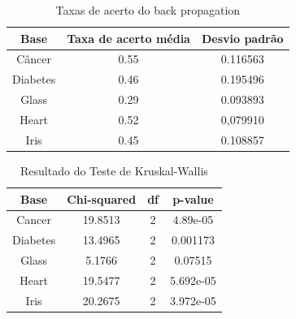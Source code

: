 \documentclass[12pt]{article}
\begin{document}
\begin{table}[!hp]
\center
\begin{tabular}{|c|c|c|}
\hline
Base & Taxa de acerto média & Desvio padrão\\ \hline
Câncer & 0.55 & 0.116563 \\ \hline
Diabetes & 0.46 & 0.195496 \\ \hline
Glass & 0.29 & 0.093893 \\ \hline
Heart & 0.52 & 0,079910 \\ \hline
Iris & 0.45 & 0.108857 \\ \hline
\end{tabular}
\caption{Taxas de acerto do back propagation}
\label{tab:hitaim}
\end{table}

\begin{table}[!h]
\center
\begin{tabular}{|c|c|c|c|}
\hline Base        & Chi-squared    & df    &  p-value \\
\hline Cancer      &  19.8513       &  2    &  4.89e-05   \\
\hline Diabetes    &  13.4965       &  2    &  0.001173   \\
\hline Glass       &   5.1766       &  2    &  0.07515    \\
\hline Heart       &  19.5477       &  2    &  5.692e-05  \\
\hline Iris        &  20.2675       &  2    &  3.972e-05  \\
\hline 
\end{tabular} 
\caption{Resultado do Teste de Kruskal-Wallis}
\label{tab:kwresult}
\end{table}

\renewcommand*\arraystretch{1.1}
\end{document}
